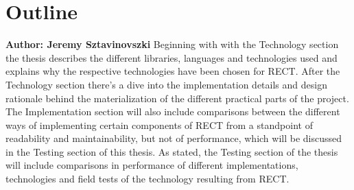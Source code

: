 \section{Outline}
\textbf{Author: Jeremy Sztavinovszki}
Beginning with with the Technology section the thesis describes the different libraries, languages and technologies used and explains why the respective technologies have been chosen for RECT.
After the Technology section there's a dive into the implementation details and design rationale behind the materialization of the different practical parts of the project.
The Implementation section will also include comparisons between the different ways of implementing certain components of RECT from a standpoint of readability and maintainability, but not of performance,
which will be discussed in the Testing section of this thesis. As stated, the Testing section of the thesis will include comparisons in performance of different implementations,
technologies and field tests of the technology resulting from RECT.






%

\filbreak
